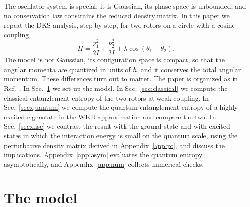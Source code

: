 \documentclass[aps,preprint,12pt,superscriptaddress,nofootinbib]{revtex4-2}
\begin{document}
The oscillator system is special: it is Gaussian, its phase space is unbounded, and
no conservation law constrains the reduced density matrix. In this paper we repeat
the DKS analysis, step by step, for two rotors on a circle with a cosine coupling,
\begin{equation}
H=\frac{p_{1}^{2}}{2I}+\frac{p_{2}^{2}}{2I}+\lambda\cos\left(\theta_{1}-\theta_{2}\right).
\label{eq:H}
\end{equation}
The model is not Gaussian, its configuration space is compact, so that the angular
momenta are quantized in units of $\hbar$, and it conserves the total angular
momentum. These differences turn out to matter. The paper is organized as in
Ref.~\cite{DKS}. In Sec.~\ref{sec:model} we set up the model. In
Sec.~\ref{sec:classical} we compute the classical entanglement entropy of the two
rotors at weak coupling. In Sec.~\ref{sec:quantum} we compute the quantum
entanglement entropy of a highly excited eigenstate in the WKB approximation and
compare the two. In Sec.~\ref{sec:disc} we contrast the result with the ground state
and with excited states in which the interaction energy is small on the quantum
scale, using the perturbative density matrix derived in Appendix~\ref{app:pt}, and
discuss the implications. Appendix~\ref{app:asym} evaluates the quantum entropy
asymptotically, and Appendix~\ref{app:num} collects numerical checks.

\section{The model}
\label{sec:model}
\end{document}
